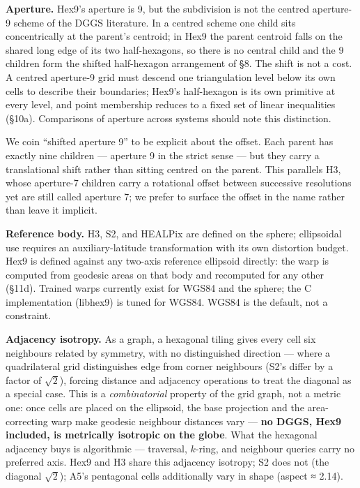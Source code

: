 \documentclass[
  11pt,
  a4paper,
]{article}
\begin{document}
\textbf{Aperture.} Hex9's aperture is 9, but the subdivision is not the
centred aperture-9 scheme of the DGGS literature. In a centred scheme
one child sits concentrically at the parent's centroid; in Hex9 the
parent centroid falls on the shared long edge of its two half-hexagons,
so there is no central child and the 9 children form the shifted
half-hexagon arrangement of §8. The shift is not a cost. A centred
aperture-9 grid must descend one triangulation level below its own cells
to describe their boundaries; Hex9's half-hexagon is its own primitive
at every level, and point membership reduces to a fixed set of linear
inequalities (§10a). Comparisons of aperture across systems should note
this distinction.

We coin ``shifted aperture 9'' to be explicit about the offset. Each
parent has exactly nine children --- aperture 9 in the strict sense ---
but they carry a translational shift rather than sitting centred on the
parent. This parallels H3, whose aperture-7 children carry a rotational
offset between successive resolutions yet are still called aperture 7;
we prefer to surface the offset in the name rather than leave it
implicit.

\textbf{Reference body.} H3, S2, and HEALPix are defined on the sphere;
ellipsoidal use requires an auxiliary-latitude transformation with its
own distortion budget. Hex9 is defined against any two-axis reference
ellipsoid directly: the warp is computed from geodesic areas on that
body and recomputed for any other (§11d). Trained warps currently exist
for WGS84 and the sphere; the C implementation (libhex9) is tuned for
WGS84. WGS84 is the default, not a constraint.

\textbf{Adjacency isotropy.} As a graph, a hexagonal tiling gives every
cell six neighbours related by symmetry, with no distinguished direction
--- where a quadrilateral grid distinguishes edge from corner neighbours
(S2's differ by a factor of \(\sqrt{2}\)), forcing distance and
adjacency operations to treat the diagonal as a special case. This is a
\emph{combinatorial} property of the grid graph, not a metric one: once
cells are placed on the ellipsoid, the base projection and the
area-correcting warp make geodesic neighbour distances vary ---
\textbf{no DGGS, Hex9 included, is metrically isotropic on the globe}.
What the hexagonal adjacency buys is algorithmic --- traversal,
\(k\)-ring, and neighbour queries carry no preferred axis. Hex9 and H3
share this adjacency isotropy; S2 does not (the diagonal \(\sqrt{2}\));
A5's pentagonal cells additionally vary in shape (aspect ≈ 2.14).
\end{document}
